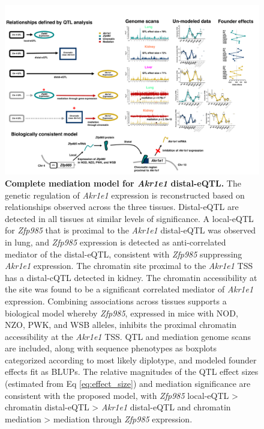 \documentclass[9pt,twocolumn,twoside]{gsajnl}
\begin{document}
\begin{figure}[hp]
\renewcommand{\familydefault}{\sfdefault}\normalfont
\centering
\includegraphics[width=\textwidth, trim={0in 0.1in 0in 0in}, clip]{figs/akr1e1_full_model_update.pdf}
\caption{\textbf{Complete mediation model for \textit{Akr1e1} distal-eQTL.}  The genetic regulation of \textit{Akr1e1} expression is reconstructed based on relationships observed across the three tissues. Distal-eQTL are detected in all tissues at similar levels of significance. A local-eQTL for \textit{Zfp985} that is proximal to the \textit{Akr1e1} distal-eQTL was observed in lung, and \textit{Zfp985} expression is detected as anti-correlated mediator of the distal-eQTL, consistent with \textit{Zfp985} suppressing \textit{Akr1e1} expression. The chromatin site proximal to the \textit{Akr1e1} TSS has a distal-cQTL detected in kidney. The chromatin accessibility at the site was found to be a significant correlated mediator of \textit{Akr1e1} expression. Combining associations across tissues supports a biological model whereby \textit{Zfp985}, expressed in mice with NOD, NZO, PWK, and WSB alleles, inhibits the proximal chromatin accessibility at the \textit{Akr1e1} TSS. QTL and mediation genome scans are included, along with sequence phenotypes as boxplots categorized according to most likely diplotype, and modeled founder effects fit as BLUPs. The relative magnitudes of the QTL effect sizes (estimated from Eq \ref{eq:effect_size}) and mediation significance are consistent with the proposed model, with \textit{Zfp985} local-eQTL > chromatin distal-eQTL > \textit{Akr1e1} distal-eQTL and chromatin mediation > mediation through \textit{Zfp985} expression.
\label{fig:akr1e1_full_model}}
\end{figure}
\end{document}
